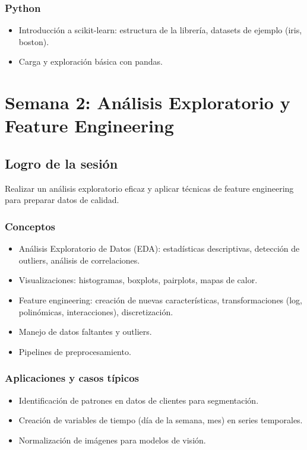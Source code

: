 \documentclass[12pt,a4paper,openany,oneside]{book}
\begin{document}
\subsection{Python}
\begin{itemize}
    \item Introducción a scikit-learn: estructura de la librería, datasets de ejemplo (iris, boston).
    \item Carga y exploración básica con pandas.
\end{itemize}

\chapter{Semana 2: Análisis Exploratorio y Feature Engineering}

\section{Logro de la sesión}
Realizar un análisis exploratorio eficaz y aplicar técnicas de feature engineering para preparar datos de calidad.

\subsection{Conceptos}
\begin{itemize}
    \item Análisis Exploratorio de Datos (EDA): estadísticas descriptivas, detección de outliers, análisis de correlaciones.
    \item Visualizaciones: histogramas, boxplots, pairplots, mapas de calor.
    \item Feature engineering: creación de nuevas características, transformaciones (log, polinómicas, interacciones), discretización.
    \item Manejo de datos faltantes y outliers.
    \item Pipelines de preprocesamiento.
\end{itemize}

\subsection{Aplicaciones y casos típicos}
\begin{itemize}
    \item Identificación de patrones en datos de clientes para segmentación.
    \item Creación de variables de tiempo (día de la semana, mes) en series temporales.
    \item Normalización de imágenes para modelos de visión.
\end{itemize}
\end{document}
